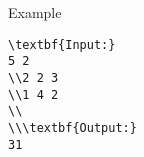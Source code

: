 Example
\begin{verbatim}
\textbf{Input:}
5 2
\\2 2 3
\\1 4 2
\\
\\\textbf{Output:}
31
\end{verbatim}
